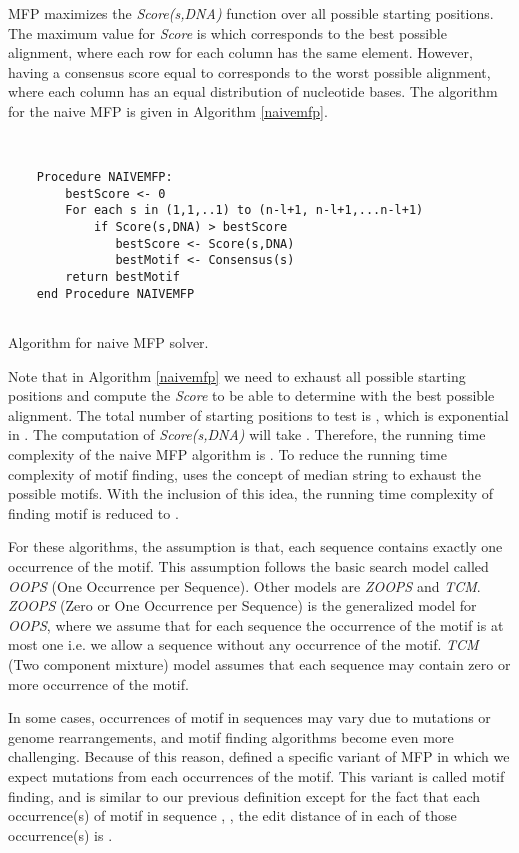 \documentclass{llncs}
\begin{document}
{MFP maximizes the \textit{Score(s,DNA)} function over all possible starting positions. The maximum value for \textit{Score} is  which corresponds to the best possible alignment, where each row for each column has the same element. However, having a consensus score equal to  corresponds to the worst possible alignment, where each column has an equal distribution of nucleotide bases. The algorithm for the naive MFP is given in Algorithm \ref{naivemfp}. 

\begin{algorithm}\label{naivemfp}
\KwIn{, }
\KwOut{}
~\\
\begin{verbatim}    
    Procedure NAIVEMFP:
        bestScore <- 0
        For each s in (1,1,..1) to (n-l+1, n-l+1,...n-l+1)
        	if Score(s,DNA) > bestScore
    	       bestScore <- Score(s,DNA)
    	       bestMotif <- Consensus(s)
        return bestMotif
    end Procedure NAIVEMFP	
	
\end{verbatim}	
\caption{Algorithm for naive MFP solver.}
\end{algorithm}

Note that in Algorithm \ref{naivemfp} we need to exhaust all possible starting positions and compute the \textit{Score} to be able to determine  with the best possible alignment. The total number of starting positions to test is , which is exponential in . The computation of \textit{Score(s,DNA)} will take . Therefore, the running time complexity of the naive MFP algorithm is .
To reduce the running time complexity of motif finding, \cite{pevznerBook} uses the concept of median string to exhaust the possible motifs. With the inclusion of this idea, the running time complexity of finding motif  is reduced to .

For these algorithms, the assumption is that, each sequence contains exactly one occurrence of the motif. This assumption follows the basic search model called \textit{OOPS} (One Occurrence per Sequence). Other models are \textit{ZOOPS} and \textit{TCM}.\textit{ ZOOPS} (Zero or One Occurrence per Sequence) is the generalized model for \textit{OOPS}, where we assume that for each sequence the occurrence of the motif is at most one i.e. we allow a sequence without any occurrence of the motif. \textit{TCM} (Two component mixture) model assumes that each sequence may contain zero or more occurrence of the motif. 

In some cases, occurrences of motif in sequences may vary due to mutations or genome rearrangements, and  motif finding algorithms become even more challenging. Because of this reason, \cite{pevznerBook} defined a specific variant of MFP in which we expect  mutations from each occurrences of the motif. This variant is called motif finding, and is similar to our previous definition except for the fact that each occurrence(s) of motif  in sequence , , the edit distance of  in each of those occurrence(s) is . 


}
\end{document}
